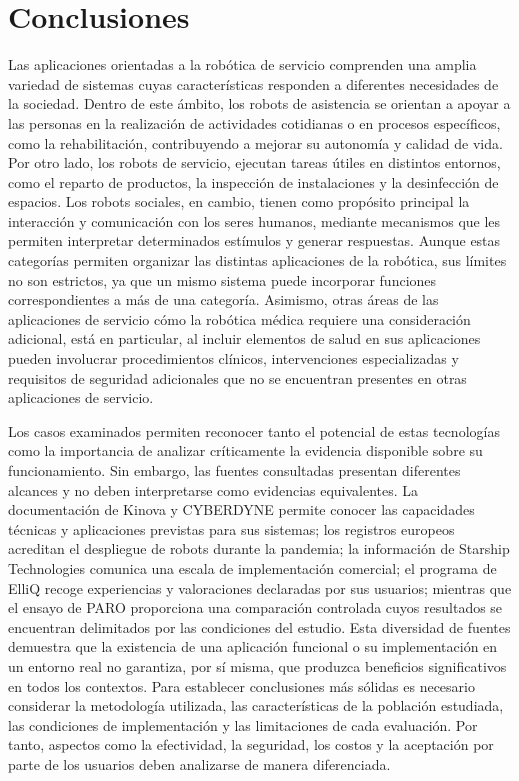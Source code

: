 \documentclass[11pt,a4paper]{article}
\begin{document}
\section{Conclusiones}
Las aplicaciones orientadas a la robótica de servicio comprenden una amplia variedad de sistemas cuyas características responden a diferentes necesidades de la sociedad. Dentro de este ámbito, los robots de asistencia se orientan a apoyar a las personas en la realización de actividades cotidianas o en procesos específicos, como la rehabilitación, contribuyendo a mejorar su autonomía y calidad de vida. Por otro lado, los robots de servicio, ejecutan tareas útiles en distintos entornos, como el reparto de productos, la inspección de instalaciones y la desinfección de espacios. Los robots sociales, en cambio, tienen como propósito principal la interacción y comunicación con los seres humanos, mediante mecanismos que les permiten interpretar determinados estímulos y generar respuestas. Aunque estas categorías permiten organizar las distintas aplicaciones de la robótica, sus límites no son estrictos, ya que un mismo sistema puede incorporar funciones correspondientes a más de una categoría. Asimismo, otras áreas de las aplicaciones de servicio cómo la robótica médica requiere una consideración adicional, está en particular, al incluir elementos de salud en sus aplicaciones pueden involucrar procedimientos clínicos, intervenciones especializadas y requisitos de seguridad adicionales que no se encuentran presentes en otras aplicaciones de servicio.

Los casos examinados permiten reconocer tanto el potencial de estas tecnologías como la importancia de analizar críticamente la evidencia disponible sobre su funcionamiento. Sin embargo, las fuentes consultadas presentan diferentes alcances y no deben interpretarse como evidencias equivalentes. La documentación de Kinova y CYBERDYNE permite conocer las capacidades técnicas y aplicaciones previstas para sus sistemas; los registros europeos acreditan el despliegue de robots durante la pandemia; la información de Starship Technologies comunica una escala de implementación comercial; el programa de ElliQ recoge experiencias y valoraciones declaradas por sus usuarios; mientras que el ensayo de PARO proporciona una comparación controlada cuyos resultados se encuentran delimitados por las condiciones del estudio. Esta diversidad de fuentes demuestra que la existencia de una aplicación funcional o su implementación en un entorno real no garantiza, por sí misma, que produzca beneficios significativos en todos los contextos. Para establecer conclusiones más sólidas es necesario considerar la metodología utilizada, las características de la población estudiada, las condiciones de implementación y las limitaciones de cada evaluación. Por tanto, aspectos como la efectividad, la seguridad, los costos y la aceptación por parte de los usuarios deben analizarse de manera diferenciada.
\end{document}

